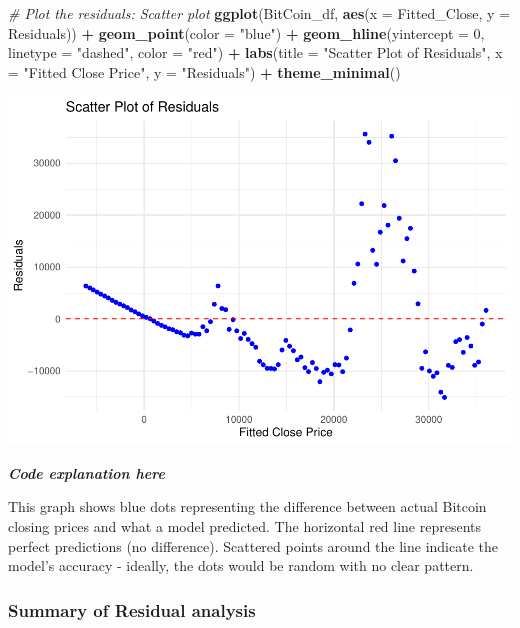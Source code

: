 \documentclass[
]{book}
\newenvironment{Shaded}{\begin{snugshade}}{\end{snugshade}}
\newcommand{\AttributeTok}[1]{\textcolor[rgb]{0.13,0.29,0.53}{#1}}
\newcommand{\CommentTok}[1]{\textcolor[rgb]{0.56,0.35,0.01}{\textit{#1}}}
\newcommand{\DecValTok}[1]{\textcolor[rgb]{0.00,0.00,0.81}{#1}}
\newcommand{\FunctionTok}[1]{\textcolor[rgb]{0.13,0.29,0.53}{\textbf{#1}}}
\newcommand{\NormalTok}[1]{#1}
\newcommand{\SpecialCharTok}[1]{\textcolor[rgb]{0.81,0.36,0.00}{\textbf{#1}}}
\newcommand{\StringTok}[1]{\textcolor[rgb]{0.31,0.60,0.02}{#1}}
\begin{document}
\begin{Shaded}
\begin{Highlighting}[]
\CommentTok{\# Plot the residuals: Scatter plot}
\FunctionTok{ggplot}\NormalTok{(BitCoin\_df, }\FunctionTok{aes}\NormalTok{(}\AttributeTok{x =}\NormalTok{ Fitted\_Close, }\AttributeTok{y =}\NormalTok{ Residuals)) }\SpecialCharTok{+}
  \FunctionTok{geom\_point}\NormalTok{(}\AttributeTok{color =} \StringTok{"blue"}\NormalTok{) }\SpecialCharTok{+}
  \FunctionTok{geom\_hline}\NormalTok{(}\AttributeTok{yintercept =} \DecValTok{0}\NormalTok{, }\AttributeTok{linetype =} \StringTok{"dashed"}\NormalTok{, }\AttributeTok{color =} \StringTok{"red"}\NormalTok{) }\SpecialCharTok{+}
  \FunctionTok{labs}\NormalTok{(}\AttributeTok{title =} \StringTok{"Scatter Plot of Residuals"}\NormalTok{,}
       \AttributeTok{x =} \StringTok{"Fitted Close Price"}\NormalTok{,}
       \AttributeTok{y =} \StringTok{"Residuals"}\NormalTok{) }\SpecialCharTok{+}
  \FunctionTok{theme\_minimal}\NormalTok{()}
\end{Highlighting}
\end{Shaded}

\includegraphics{bookdown-demo_files/figure-latex/unnamed-chunk-22-1.pdf}

\emph{\textbf{Code explanation here}}

This graph shows blue dots representing the difference between actual Bitcoin closing prices and what a model predicted. The horizontal red line represents perfect predictions (no difference). Scattered points around the line indicate the model's accuracy - ideally, the dots would be random with no clear pattern.

\subsubsection{Summary of Residual analysis}\label{summary-of-residual-analysis}
\end{document}
